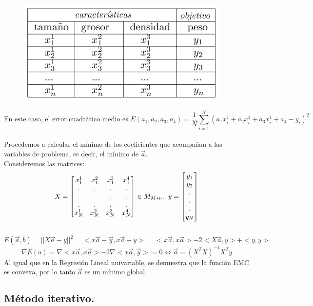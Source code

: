 \documentclass[a4paper,10pt]{article}
\begin{document}
\begin{figure}[H]
\centering
\includegraphics[scale=0.7]{Annotation 2020-03-23 133547}
\end{figure}
 \[\text{En este caso, el error cuadrático medio es } E(a_{1},a_{2},a_{3},a_{4})=\frac{1}{N}\sum_{i=1}^{N}(a_{1}x_i^1+a_{2}x_i^1+a_{3}x_i^1+a_{4}-y_{i})^2
\]
\\Procedemos a calcular el mínimo de los coeficientes que acompañan a las variables de problema, es decir, el mínimo de $\vec{a}$.
\indent
\\Consideremos las matrices:
\[X= \begin{bmatrix}
    x_{1}^1 & x_{1}^2 & x_{1}^3 & x_{1}^4  \\
    .&.&.&.\\
    .&.&.&.\\
    .&.&.&.\\
    x_{N}^1 & x_{N}^2 & x_{N}^3 & x_{N}^4 
\end{bmatrix} \in M_{M*n}. \hspace{0.20cm} y=\begin{bmatrix}y_{1}\\y_{2}\\.\\.\\.\\y_{N}\end{bmatrix}\] \\ \[E(\vec{a},b)=||X\vec{a}-y||^2 = <x\vec{a}-\vec{y},x\vec{a}-y>=<x\vec{a},x\vec{a}>-2<X\vec{a},y>+<y,y>\]
\[\nabla E(a)=\nabla<x\vec{a},x\vec{a}>-2\nabla<x\vec{a},\vec{y}>=0\Leftrightarrow \boxed{ \vec{a}=(X^T X)^{-1} X^T y}\]
Al igual que en la Regresión Lineal univariable, se demuestra que la función EMC es convexa, por lo tanto $\vec{a}$ es un mínimo global.


\subsection{Método iterativo.}
\end{document}
